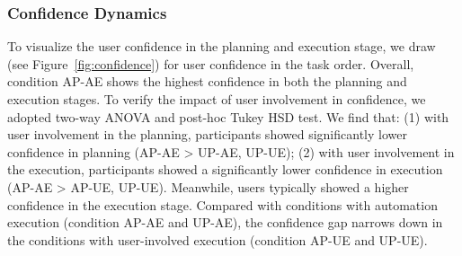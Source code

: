 \subsubsection{Confidence Dynamics}
To visualize the user confidence in the planning and execution stage, we draw  (see Figure~\ref{fig:confidence}) for user confidence in the task order. 
Overall, condition AP-AE shows the highest confidence in both the planning and execution stages. 
To verify the impact of user involvement in confidence, we adopted two-way ANOVA and post-hoc Tukey HSD test. 
We find that: (1) with user involvement in the planning, participants showed significantly lower confidence in planning (AP-AE > UP-AE, UP-UE); (2) with user involvement in the execution, participants showed a significantly lower confidence in execution (AP-AE > AP-UE, UP-UE). 
Meanwhile, users typically showed a higher confidence in the execution stage. 
Compared with conditions with automation execution (\ie condition AP-AE and UP-AE), the confidence gap narrows down in the conditions with user-involved execution (\ie condition AP-UE and UP-UE). %



